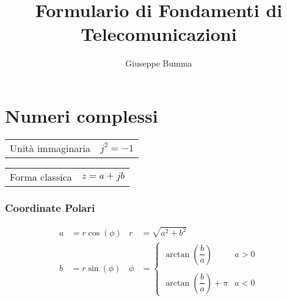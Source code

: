 \documentclass{article}
\title{Formulario di Fondamenti di Telecomunicazioni}
\author{Giuseppe Bumma}
\begin{document}
\newcommand{\R}{\mathbb{R}}
\newcommand{\bb}[1]{\mathbb{#1}}
\newcommand{\cc}[1]{\mathcal{#1}}
\newcommand{ \lognormal }{\text{Lognormal} }
\newcommand{\tb}[1]{\textbf{#1}}
\newcommand*\circled[1]{\tikz[baseline=(char.base)]{%
            \node[shape=circle,draw,inner sep=2pt] (char) {#1};}}


\tableofcontents

\maketitle

\section{Numeri complessi}
\begin{center}
    \renewcommand{\arraystretch}{2.5}
    \begin{tabular}{c c}
        Unità immaginaria & $j^2=-1$\\
    \end{tabular}
    \begin{tabular}{c c}
        Forma classica & $z = a + jb$\\
    \end{tabular}
\end{center}
\subsubsection*{Coordinate Polari}
\begin{align*}
    a &= r \cos(\phi) & r &= \sqrt{a^2 + b^2}\\
    b &= r \sin (\phi) & \phi &= 
    \begin{cases}
        \arctan\left( \dfrac{b}{a} \right) &a > 0\\
        \\
        \arctan \left( \dfrac{b}{a} \right) + \pi &a<0
    \end{cases}
\end{align*}
\subsubsection*{}
\end{document}
